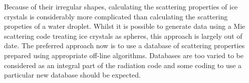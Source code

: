 Because of their irregular shapes, calculating the scattering properties
of ice crystals is considerably more complicated than calculating the
scattering propeties of a water droplet. Whilst it is possible to
generate data using a Mie scattering code treating ice crystals as
spheres, this approach is largely out of date. The preferred approach
now is to use a database of scattering properties prepared using
appropriate off-line algorithms. 
Databases are too varied to be considered as an integral part of the 
radiation code and some coding to use a particular new database should
be expected.
